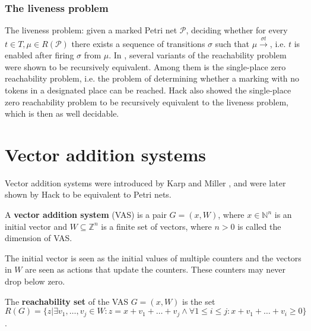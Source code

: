 \subsubsection{The liveness problem} %
\label{ssub:the_liveness_problem}
  The liveness problem: given a marked Petri net $\mathcal P$, deciding whether for every $t\in T, \mu\in R(\mathcal P)$ there exists a sequence of transitions $\sigma$ such that $\mu\xrightarrow{\sigma t}$, i.e. $t$ is enabled after firing $\sigma$ from $\mu$. In \cite{Hack74PetriNetLiveness}, several variants of the reachability problem were shown to be recursively equivalent. Among them is the single-place zero reachability problem, i.e. the problem of determining whether a marking with no tokens in a designated place can be reached. Hack also showed the single-place zero reachability problem to be recursively equivalent to the liveness problem, which is then as well decidable.



\section{Vector addition systems} %
\label{sec:vector_addition_systems}

Vector addition systems were introduced by Karp and Miller \cite{Karp69ParallelProgramSchemata}, and were later shown by Hack \cite{Hack74PetriVAS} to be equivalent to Petri nets.

\begin{definition}
  A {\bf vector addition system} (VAS) is a pair $G = (x, W)$, where $x\in \mathbb N^n$ is an initial vector and $W\subseteq \mathbb Z^n$ is a finite set of vectors, where $n>0$ is called the dimension of VAS.
\end{definition}

The initial vector is seen as the initial values of multiple counters and the vectors in $W$ are seen as actions that update the counters. These counters may never drop below zero. 

\begin{definition}
  The {\bf reachability set} of the VAS $G = (x,W)$ is the set \linebreak $R(G) = \{z | \exists v_1,\ldots,v_j\in W: z=x+v_1+\ldots+v_j \wedge \forall 1\leq i\leq j: x+v_1+\ldots+v_i\geq 0\}$.
\end{definition}

